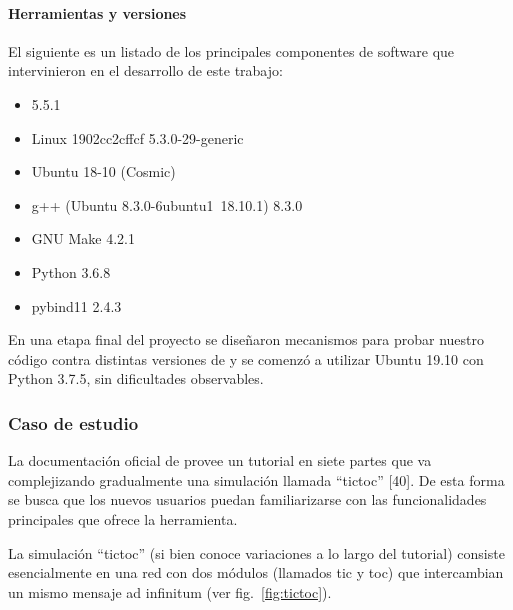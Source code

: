 \documentclass[]{article}
\begin{document}
\paragraph{Herramientas y versiones}

El siguiente es un listado de los principales componentes de software que
intervinieron en el desarrollo de este trabajo:

\begin{itemize}
    \item \omnetpp{} 5.5.1

    \item Linux 1902cc2cffcf 5.3.0-29-generic

    \item Ubuntu 18-10 (Cosmic)

    \item g++ (Ubuntu 8.3.0-6ubuntu1~18.10.1) 8.3.0

    \item GNU Make 4.2.1

    \item Python 3.6.8

    \item pybind11 2.4.3
\end{itemize}

En una etapa final del proyecto se diseñaron mecanismos para probar nuestro
código contra distintas versiones de \omnetpp{} y se comenzó a utilizar Ubuntu
19.10 con Python 3.7.5, sin dificultades observables.

\subsubsection{Caso de estudio}
La documentación oficial de \omnetpp{} provee un tutorial en siete partes que va
complejizando gradualmente una simulación llamada ``tictoc'' [40]. De esta forma
se busca que los nuevos usuarios puedan familiarizarse con las funcionalidades
principales que ofrece la herramienta.

La simulación ``tictoc'' (si bien conoce variaciones a lo largo del tutorial)
consiste esencialmente en una red con dos módulos (llamados tic y toc) que
intercambian un mismo mensaje ad infinitum (ver fig.~\ref{fig:tictoc}).
\end{document}
